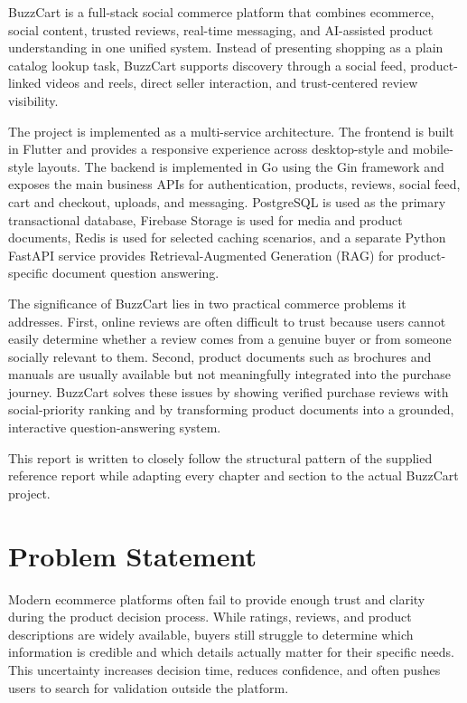 \documentclass[12pt,letterpaper]{report}
\begin{document}
BuzzCart is a full-stack social commerce platform that combines ecommerce, social content, trusted reviews, real-time messaging, and AI-assisted product understanding in one unified system. Instead of presenting shopping as a plain catalog lookup task, BuzzCart supports discovery through a social feed, product-linked videos and reels, direct seller interaction, and trust-centered review visibility.

The project is implemented as a multi-service architecture. The frontend is built in Flutter and provides a responsive experience across desktop-style and mobile-style layouts. The backend is implemented in Go using the Gin framework and exposes the main business APIs for authentication, products, reviews, social feed, cart and checkout, uploads, and messaging. PostgreSQL is used as the primary transactional database, Firebase Storage is used for media and product documents, Redis is used for selected caching scenarios, and a separate Python FastAPI service provides Retrieval-Augmented Generation (RAG) for product-specific document question answering.

The significance of BuzzCart lies in two practical commerce problems it addresses. First, online reviews are often difficult to trust because users cannot easily determine whether a review comes from a genuine buyer or from someone socially relevant to them. Second, product documents such as brochures and manuals are usually available but not meaningfully integrated into the purchase journey. BuzzCart solves these issues by showing verified purchase reviews with social-priority ranking and by transforming product documents into a grounded, interactive question-answering system.

This report is written to closely follow the structural pattern of the supplied reference report while adapting every chapter and section to the actual BuzzCart project.

\chapter{Problem Statement}

Modern ecommerce platforms often fail to provide enough trust and clarity during the product decision process. While ratings, reviews, and product descriptions are widely available, buyers still struggle to determine which information is credible and which details actually matter for their specific needs. This uncertainty increases decision time, reduces confidence, and often pushes users to search for validation outside the platform.
\end{document}
